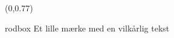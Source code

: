 \documentclass[t,24pt]{beamer}
\begin{document}
{
\begin{frame}[billede]
    \begin{textblock*}{\textwidth}(0\textwidth,0.77\textheight)
        \begin{beamercolorbox}[wd=6.4cm,sep=0.3cm]{rodbox}
            Et lille mærke med en vilkårlig tekst
        \end{beamercolorbox}
    \end{textblock*}
\end{frame}
}
\end{document}
